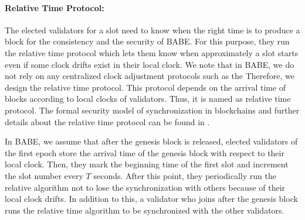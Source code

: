 


\paragraph{Relative Time Protocol:}

The elected validators for a slot need to know when the right time is to produce a block for the consistency and the security of BABE.
For this purpose, they run the relative time protocol which lets
them know when approximately a slot starts even if some clock drifts exist in their local clock. We note that in BABE, we do not rely on any centralized clock adjustment protocols such as the
Therefore, we design the relative time protocol. This protocol depends on the arrival time of blocks according to local clocks of validators. Thus, it is named as relative time protocol.
The formal security model of synchronization in blockchains and further details about the relative time protocol can be found in \cite{consensusonclock}.

In BABE, we assume that after the genesis block is released, elected validators of the first epoch store the arrival time of the genesis block with respect to their local clock. Then, they mark the beginning
 time of the first slot and increment
the slot number every $ T $ seconds. After this point,  they periodically run the relative algorithm not to lose the synchronization with others because of their local clock drifts.  In addition to this, a validator who
joins after the genesis block runs the relative time algorithm to be synchronized with the other validators.

